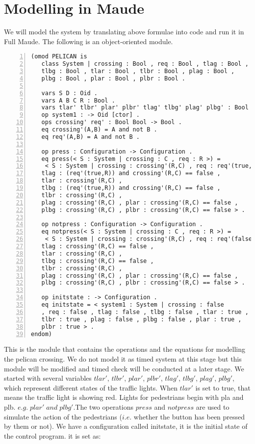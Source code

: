 \documentclass[a4paper,11pt]{report}
\begin{document}
\section{Modelling in Maude}
We will model the system by translating above formulae into code and run it in Full Maude. The following is an object-oriented module. 
\newpage
\begin{lstlisting}[numbers=left, frame=lines]
(omod PELICAN is 
   class System | crossing : Bool , req : Bool , tlag : Bool ,
   tlbg : Bool , tlar : Bool , tlbr : Bool , plag : Bool , 
   plbg : Bool , plar : Bool , plbr : Bool .

   vars S D : Oid .
   vars A B C R : Bool .
   vars tlar' tlbr' plar' plbr' tlag' tlbg' plag' plbg' : Bool .
   op system1 : -> Oid [ctor] .
   ops crossing' req' : Bool Bool -> Bool .
   eq crossing'(A,B) = A and not B .
   eq req'(A,B) = A and not B .

   op press : Configuration -> Configuration .
   eq press(< S : System | crossing : C , req : R >) = 
    < S : System | crossing : crossing'(R,C) , req : req'(true,R) , 
   tlag : (req'(true,R)) and crossing'(R,C) == false ,
   tlar : crossing'(R,C) ,
   tlbg : (req'(true,R)) and crossing'(R,C) == false , 
   tlbr : crossing'(R,C) ,
   plag : crossing'(R,C) , plar : crossing'(R,C) == false ,
   plbg : crossing'(R,C) , plbr : crossing'(R,C) == false > .

   op notpress : Configuration -> Configuration .
   eq notpress(< S : System | crossing : C , req : R >) = 
    < S : System | crossing : crossing'(R,C) , req : req'(false,R) , 
   tlag : crossing'(R,C) == false ,
   tlar : crossing'(R,C) ,
   tlbg : crossing'(R,C) == false , 
   tlbr : crossing'(R,C) ,
   plag : crossing'(R,C) , plar : crossing'(R,C) == false ,
   plbg : crossing'(R,C) , plbr : crossing'(R,C) == false > .

   op initstate : -> Configuration .
   eq initstate = < system1 : System | crossing : false 
   , req : false , tlag : false , tlbg : false , tlar : true , 
   tlbr : true , plag : false , plbg : false , plar : true , 
   plbr : true > .
endom)
\end{lstlisting}
\vspace{0.2cm}
This is the module that contains the operations and the equations for modelling the pelican crossing. We do not model it as timed system at this stage but this module will be modified and timed check will be conducted at a later stage.
We started with several variables $tlar'$, $tlbr'$, $plar'$, $plbr'$, $tlag'$, $tlbg'$, $plag'$, $plbg'$, which represent different states of the  traffic lights. When $tlar'$ is set to true, that means the traffic light is showing red. Lights for pedestrians begin with pla and plb. $e.g.\;plar'\;and\;plbg'$.\newline The two operations $press$ and $notpress$ are used to simulate the action of the pedestrians ($i.e.$ whether the button has been pressed by them or not). We have a configuration called initstate, it is the initial state of the control program. it is set as:
\end{document}

